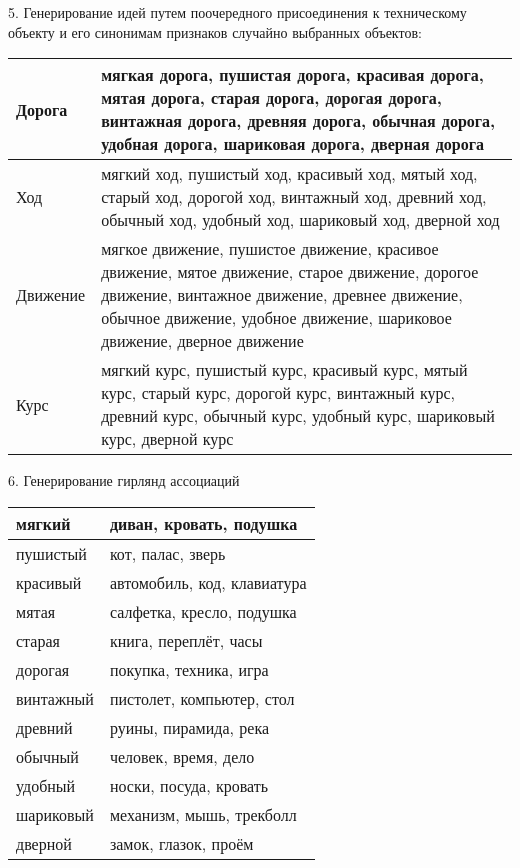5. Генерирование идей путем поочередного присоединения к техническому объекту и его синонимам 
признаков случайно выбранных объектов:
\begin{table}[h!]
    \center
    \begin{tabularx}{\textwidth}{|X|X|}
        \hline
        Дорога & мягкая дорога, пушистая дорога, красивая дорога, мятая дорога, старая дорога, 
            дорогая дорога, винтажная дорога, древняя дорога, обычная дорога, удобная дорога, 
            шариковая дорога, дверная дорога \\ \hline
        Ход & мягкий ход, пушистый ход, красивый ход, мятый ход, старый ход, дорогой ход, 
            винтажный ход, древний ход, обычный ход, удобный ход, шариковый ход, 
            дверной ход \\ \hline
        Движение & мягкое движение, пушистое движение, красивое движение, мятое движение, 
            старое движение, дорогое движение, винтажное движение, древнее движение, 
            обычное движение, удобное движение, шариковое движение, дверное движение \\ \hline
        Курс & мягкий курс, пушистый курс, красивый курс, мятый курс, старый курс, дорогой курс, 
            винтажный курс, древний курс, обычный курс, удобный курс, шариковый курс, 
            дверной курс \\ \hline
    \end{tabularx}
\end{table}

6. Генерирование гирлянд ассоциаций

\begin{table}[h!]
    \center
    \begin{tabularx}{\textwidth}{|X|X|}
        \hline
        мягкий & диван, кровать, подушка \\ \hline
        пушистый & кот, палас, зверь \\ \hline 
        красивый & автомобиль, код, клавиатура \\ \hline
        мятая & салфетка, кресло, подушка \\ \hline
        старая & книга, переплёт, часы \\ \hline
        дорогая & покупка, техника, игра \\ \hline
        винтажный & пистолет, компьютер, стол \\ \hline
        древний & руины, пирамида, река \\ \hline
        обычный & человек, время, дело \\ \hline
        удобный & носки, посуда, кровать \\ \hline
        шариковый & механизм, мышь, трекболл \\ \hline
        дверной & замок, глазок, проём \\ \hline
    \end{tabularx}
\end{table}

